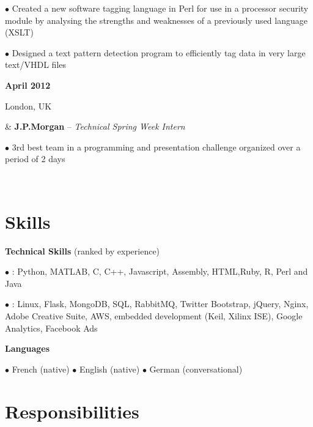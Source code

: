 \documentclass[a4paper,10pt,oneside]{article}
\begin{document}
\begin{body}
$\bullet$ Created a new software tagging language in Perl for use in a processor security module by analysing the strengths and weaknesses of a previously used language (XSLT)

$\bullet$ Designed a text pattern detection program to efficiently tag data in very large text/VHDL files
\\ {\textbf{April 2012} \par London, UK} & \textbf{J.P.Morgan} – \textit{Technical Spring Week Intern}


$\bullet$ 3rd best team in a programming and presentation challenge organized over a period of 2 days

\end{body}\

\section*{Skills}


\begin{flushleft}
	\vspace{-0.8em}
	
	
	\hspace{1em} \textbf{Technical Skills} (ranked by experience)
	
	\hspace{2em} $\bullet$ \underline{}: Python, MATLAB, C, C++, Javascript, Assembly, HTML,Ruby, R, Perl and Java
	
	\hspace{2em} \parbox{0.95\textwidth}{$\bullet$ \underline{}: Linux, Flask, MongoDB, SQL, RabbitMQ, Twitter Bootstrap, jQuery, Nginx, Adobe Creative Suite, AWS, embedded  development (Keil, Xilinx ISE), Google Analytics, Facebook Ads}
	
	\hspace{1em} \textbf{Languages}
	
	\hspace{2em} $\bullet$ French (native) $\bullet$ English (native) $\bullet$ German (conversational)
	
\end{flushleft}


\section*{Responsibilities}
\end{document}
